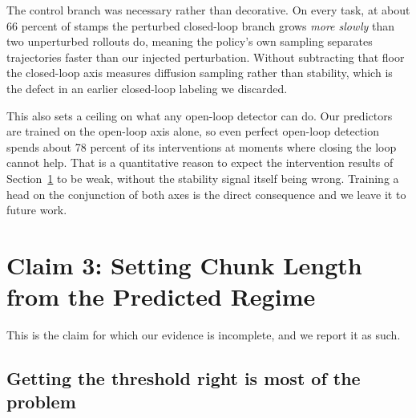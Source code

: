 The control branch was necessary rather than decorative. On every task, at
about 66 percent of stamps the perturbed closed-loop branch grows
\emph{more slowly} than two unperturbed rollouts do, meaning the policy's own
sampling separates trajectories faster than our injected perturbation. Without
subtracting that floor the closed-loop axis measures diffusion sampling rather
than stability, which is the defect in an earlier closed-loop labeling we
discarded.

This also sets a ceiling on what any open-loop detector can do. Our predictors
are trained on the open-loop axis alone, so even perfect open-loop detection
spends about 78 percent of its interventions at moments where closing the loop
cannot help. That is a quantitative reason to expect the intervention results
of Section~\ref{sec:claim3} to be weak, without the stability signal itself
being wrong. Training a head on the conjunction of both axes is the direct
consequence and we leave it to future work.

\section{Claim 3: Setting Chunk Length from the Predicted Regime}
\label{sec:claim3}

This is the claim for which our evidence is incomplete, and we report it as
such.


\subsection{Getting the threshold right is most of the problem}

